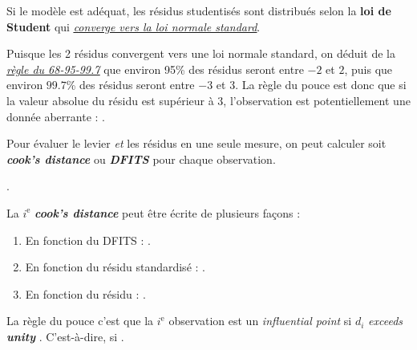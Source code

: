 \documentclass[french]{article}
\begin{document}
\begin{multicols*}{2}
\begin{definitionNOHFILLsub}
\bigskip

Si le modèle est adéquat, les résidus studentisés sont distribués selon la \textbf{loi de Student} qui \textit{\color{bleudefrance}\underline{\hyperlink{studentReminder}{\color{bleudefrance} converge vers la loi normale standard}}}.
\end{definitionNOHFILLsub}

Puisque les 2 résidus convergent vers une loi normale standard, on déduit de la \textit{\color{bleudefrance}\underline{\hyperlink{6895997Rule}{\color{bleudefrance} règle du 68-95-99.7}}} que environ 95\% des résidus seront entre $-2$ et $2$, puis que environ $99.7$\% des résidus seront entre $-3$ et $3$. La règle du pouce est donc que si la valeur absolue du résidu est supérieur à $3$, l'observation est potentiellement une donnée aberrante : .

\bigskip

\begin{rappel_enhanced}[Contexte]
Pour évaluer le levier \textit{et} les résidus en une seule mesure, on peut calculer soit \og \textit{\textbf{cook's distance}} \fg{} ou \textit{\textbf{DFITS}} pour chaque observation.
\end{rappel_enhanced}

\begin{definitionNOHFILL}[DFITS]
.
\end{definitionNOHFILL}

\begin{definitionNOHFILL}
La $i^{\text{e}}$ \og \textit{\textbf{cook's distance}} \fg{} peut être écrite de plusieurs façons : 
\begin{enumerate}
	\item	En fonction du DFITS : .
	\item	En fonction du résidu standardisé : .
	\item	En fonction du résidu : .
\end{enumerate}
  

\bigskip

La règle du pouce c'est que la $i^{\text{e}}$ observation est un \og \textit{influential point} \fg{} si $d_{i}$ \og \textit{exceeds \textbf{unity}} \fg{}. C'est-à-dire, si .
\end{definitionNOHFILL}
	


\end{multicols*}
\end{document}
